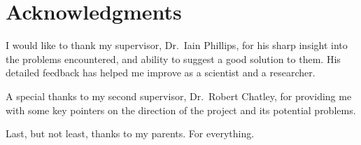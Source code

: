 
\chapter{Acknowledgments} %

\label{Acknowledgments} %


I would like to thank my supervisor, Dr.\ Iain Phillips, for his sharp insight into the problems encountered, and ability to suggest a good solution to them. His detailed feedback has helped me improve as a scientist and a researcher.

A special thanks to my second supervisor, Dr.\ Robert Chatley, for providing me with some key pointers on the direction of the project and its potential problems.

Last, but not least, thanks to my parents. For everything.

